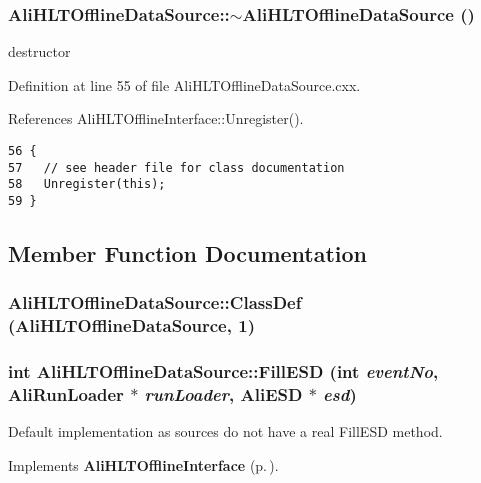\subsubsection{\setlength{\rightskip}{0pt plus 5cm}Ali\-HLTOffline\-Data\-Source::$\sim${\bf Ali\-HLTOffline\-Data\-Source} ()\hspace{0.3cm}{\tt  [virtual]}}\label{classAliHLTOfflineDataSource_a3}


destructor 

Definition at line 55 of file Ali\-HLTOffline\-Data\-Source.cxx.

References Ali\-HLTOffline\-Interface::Unregister().

\footnotesize\begin{verbatim}56 {
57   // see header file for class documentation
58   Unregister(this);
59 }
\end{verbatim}\normalsize 




\subsection{Member Function Documentation}
\subsubsection{\setlength{\rightskip}{0pt plus 5cm}Ali\-HLTOffline\-Data\-Source::Class\-Def ({\bf Ali\-HLTOffline\-Data\-Source}, 1)\hspace{0.3cm}{\tt  [private]}}\label{classAliHLTOfflineDataSource_d0}


\subsubsection{\setlength{\rightskip}{0pt plus 5cm}int Ali\-HLTOffline\-Data\-Source::Fill\-ESD (int {\em event\-No}, Ali\-Run\-Loader $\ast$ {\em run\-Loader}, Ali\-ESD $\ast$ {\em esd})\hspace{0.3cm}{\tt  [inline, virtual]}}\label{classAliHLTOfflineDataSource_a4}


Default implementation as sources do not have a real Fill\-ESD method. 

Implements {\bf Ali\-HLTOffline\-Interface} {\rm (p.\,\pageref{classAliHLTOfflineInterface_a11})}.

